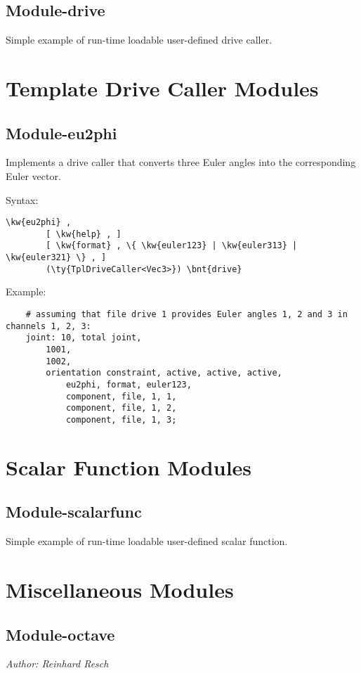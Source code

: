 \subsection{Module-drive}
Simple example of run-time loadable user-defined drive caller.



\section{Template Drive Caller Modules}

\subsection{Module-eu2phi}
Implements a  drive caller
that converts three Euler angles into the corresponding Euler vector.

Syntax:
\begin{Verbatim}[commandchars=\\\{\}]
    \kw{eu2phi} ,
        [ \kw{help} , ]
        [ \kw{format} , \{ \kw{euler123} | \kw{euler313} | \kw{euler321} \} , ]
        (\ty{TplDriveCaller<Vec3>}) \bnt{drive}
\end{Verbatim}
Example:
\begin{verbatim}
    # assuming that file drive 1 provides Euler angles 1, 2 and 3 in channels 1, 2, 3:
    joint: 10, total joint,
        1001,
        1002,
        orientation constraint, active, active, active,
            eu2phi, format, euler123,
            component, file, 1, 1,
            component, file, 1, 2,
            component, file, 1, 3;
\end{verbatim}


\section{Scalar Function Modules}

\subsection{Module-scalarfunc}
Simple example of run-time loadable user-defined scalar function.



\section{Miscellaneous Modules}

\subsection{Module-octave}
\emph{Author: Reinhard Resch}

